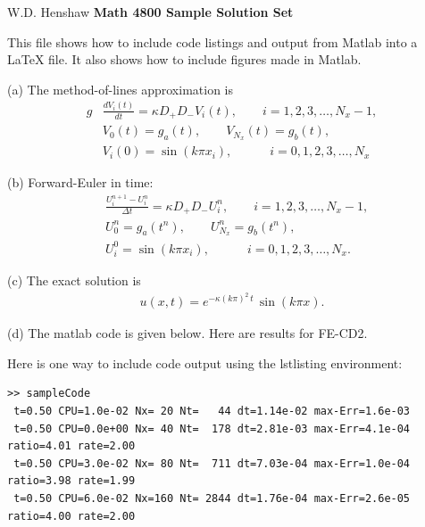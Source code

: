 \documentclass[11pt]{article}
\newcommand{\Dp}{D_+}
\newcommand{\Dm}{D_-}
\newcommand{\dt}{\Delta t}
\newcommand{\Nx}{N_x}
\begin{document}
\begin{flushleft}
W.D. Henshaw \hfill \textbf{\large Math 4800 Sample Solution Set} \hfill ~~~~~~~~~~~~~~~~~
\end{flushleft}

\medskip
This file shows how to include code listings and output from Matlab into a LaTeX file.
It also shows how to include figures made in Matlab. 

\bigskip
{}



\bigskip
{}(a) The method-of-lines approximation is
\begin{align*}g
 &  \frac{d V_i(t)}{dt} = \kappa \Dp\Dm V_i(t) , \qquad i=1,2,3,\ldots,\Nx-1, \\
 &   V_0(t) = g_a(t), \qquad V_{\Nx}(t) = g_b(t), \\
 &   V_i(0) = \sin(k\pi x_i), \quad \qquad i=0,1,2,3,\ldots,\Nx
\end{align*}

\medskip
{}(b) Forward-Euler in time: 
\begin{align*}
 &  \frac{U_i^{n+1} - U_i^n}{\dt} = \kappa \Dp\Dm U_i^n , \qquad i=1,2,3,\ldots,\Nx-1, \\
 &   U_0^n = g_a(t^n), \qquad U_{\Nx}^n = g_b(t^n), \\
 &   U_i^0 = \sin(k\pi x_i), \quad \qquad i=0,1,2,3,\ldots,\Nx.
\end{align*}

\bigskip
{}(c) The exact solution is 
\begin{align*}
   u(x,t) = e^{ -  \kappa(k\pi)^2  \, t }\, \sin(k\pi x).
\end{align*}

\medskip
{}(d)  The matlab code is given below. Here are results for FE-CD2.

\medskip\noindent
Here is one way to include code output using the lstlisting environment: 
\begin{lstlisting}[frame=single,caption={Results from 1(d).},label=lst:FE-CD2]
>> sampleCode
 t=0.50 CPU=1.0e-02 Nx= 20 Nt=   44 dt=1.14e-02 max-Err=1.6e-03
 t=0.50 CPU=0.0e+00 Nx= 40 Nt=  178 dt=2.81e-03 max-Err=4.1e-04 ratio=4.01 rate=2.00
 t=0.50 CPU=3.0e-02 Nx= 80 Nt=  711 dt=7.03e-04 max-Err=1.0e-04 ratio=3.98 rate=1.99
 t=0.50 CPU=6.0e-02 Nx=160 Nt= 2844 dt=1.76e-04 max-Err=2.6e-05 ratio=4.00 rate=2.00
\end{lstlisting}
\end{document}
